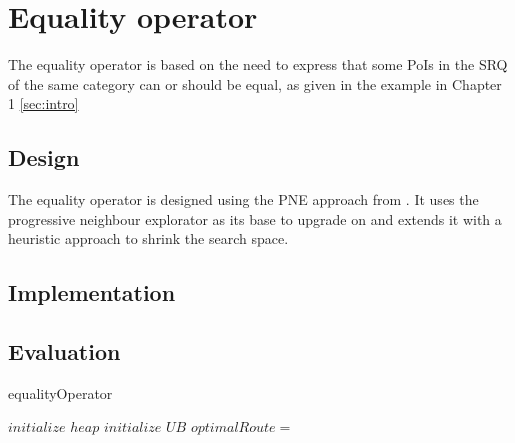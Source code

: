 \section{Equality operator}
The equality operator is based on the need to express that some PoIs in the SRQ of the same category can or should be equal, as given in the example in Chapter 1 \ref{sec:intro}

\subsection{Design} 
\label{sec:design}
The equality operator is designed using the PNE approach from \cite{OSR}. It uses the progressive neighbour explorator as  its base to upgrade on and extends it with a heuristic approach to shrink the search space. 

\subsection{Implementation}
\label{sec:implementation}

\subsection{Evaluation}
\label{sec:evaluation}




\begin{algorithm}
	\caption{equalityOperator}
	
	\BlankLine
	
	$initialize$ $heap$\; 
	$initialize$ $UB$\; 
	$optimalRoute =$\;
	{
		\dummySR{}\;
		\modifiedPNE{}\;
	}
\end{algorithm}

